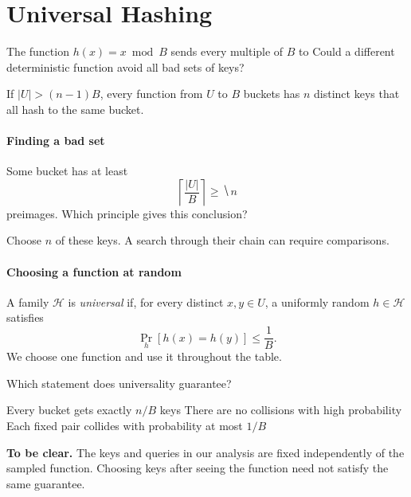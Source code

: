 \documentclass[11pt]{article}
\begin{document}
\newpage
\section{Universal Hashing}
The function $h(x)=x\bmod B$ sends every multiple of $B$ to
 Could a different deterministic function avoid all bad
sets of keys?

\begin{theorem}
    If $|U|>(n-1)B$, every function from $U$ to $B$ buckets has $n$ distinct
    keys that all hash to the same bucket.
\end{theorem}

\paragraph{Finding a bad set}
Some bucket has at least
\begin{equation*}
    \left\lceil\frac{|U|}{B}\right\rceil\geq\hide{n}
\end{equation*}
preimages. Which principle gives this conclusion?
\vs{.5cm}

Choose $n$ of these keys. A search through their chain can require
 comparisons.

\paragraph{Choosing a function at random}
A family $\mathcal H$ is \emph{universal} if, for every distinct $x,y\in U$,
a uniformly random $h\in\mathcal H$ satisfies
\begin{equation*}
    \Pr_h[h(x)=h(y)]\leq\frac1B.
\end{equation*}
We choose one function and use it throughout the table.

\begin{Qu}
    Which statement does universality guarantee?
    \begin{itemize}
        \aitem Every bucket gets exactly $n/B$ keys
        \bitem There are no collisions with high probability
        \citem Each fixed pair collides with probability at most $1/B$
    \end{itemize}
\end{Qu}

\vfill
\textbf{To be clear.} The keys and queries in our analysis are fixed
independently of the sampled function. Choosing keys after seeing the function
need not satisfy the same guarantee.
\end{document}
